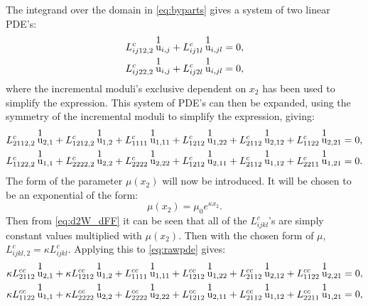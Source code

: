 \documentclass[11pt]{article}
\begin{document}
The integrand over the domain in \eqref{eq:byparts} gives a system of two linear PDE's:
\begin{equation}
\begin{aligned}
L^c_{ij12,2} \: \stackon{u}{1}_{i,j} + L^c_{ij1l} \: \stackon{u}{1}_{i,jl} &= 0, \\
L^c_{ij22,2} \: \stackon{u}{1}_{i,j} + L^c_{ij2l} \: \stackon{u}{1}_{i,jl} &= 0 , 
\end{aligned}
\end{equation}
where the incremental moduli's exclusive dependent on $x_2$ has been used to simplify the expression. This system of PDE's can then be expanded, using the symmetry of the incremental moduli to simplify the expression, giving: 
\begin{equation} \label{eq:rawpde}
\begin{aligned}
L^c_{2112,2} \: \stackon{u}{1}_{2,1} + L^c_{1212,2} \: \stackon{u}{1}_{1,2} + L^c_{1111} \: \stackon{u}{1}_{1,11} + L^c_{1212} \: \stackon{u}{1}_{1,22}+ L^c_{2112} \: \stackon{u}{1}_{2,12}  + L^c_{1122} \: \stackon{u}{1}_{2,21} &= 0, \\
L^c_{1122,2} \: \stackon{u}{1}_{1,1} + L^c_{2222,2} \: \stackon{u}{1}_{2,2} + L^c_{2222} \: \stackon{u}{1}_{2,22}+ L^c_{1212} \: \stackon{u}{1}_{2,11}+ L^c_{2112} \: \stackon{u}{1}_{1,12}  + L^c_{2211} \: \stackon{u}{1}_{1,21} &= 0.
\end{aligned}
\end{equation}
The form of the parameter $\mu(x_2)$ will now be introduced. It will be chosen to be an exponential of the form:
\begin{equation}
\mu(x_2) = \mu_0 e^{\kappa x_2}.
\end{equation}
Then from \eqref{eq:d2W_dFF} it can be seen that all of the $L^c_{ijkl}$'s are simply constant values multiplied with $\mu(x_2)$. Then with the chosen form of $\mu$, $L^c_{ijkl,2} = \kappa L^c_{ijkl}$. Applying this to \eqref{eq:rawpde} gives:
\begin{equation} \label{eq:pde}
\begin{aligned}
\kappa L^{cc}_{2112} \: \stackon{u}{1}_{2,1} + \kappa L^{cc}_{1212} \: \stackon{u}{1}_{1,2} + L^{cc}_{1111} \: \stackon{u}{1}_{1,11} + L^{cc}_{1212} \: \stackon{u}{1}_{1,22}+ L^{cc}_{2112} \: \stackon{u}{1}_{2,12}  + L^{cc}_{1122} \: \stackon{u}{1}_{2,21} &= 0,\\
\kappa L^{cc}_{1122} \: \stackon{u}{1}_{1,1} + \kappa L^{cc}_{2222} \: \stackon{u}{1}_{2,2} + L^{cc}_{2222} \: \stackon{u}{1}_{2,22}+ L^{cc}_{1212} \: \stackon{u}{1}_{2,11}+ L^{cc}_{2112} \: \stackon{u}{1}_{1,12}  + L^{cc}_{2211} \: \stackon{u}{1}_{1,21} &= 0,
\end{aligned}
\end{equation}
\end{document}
